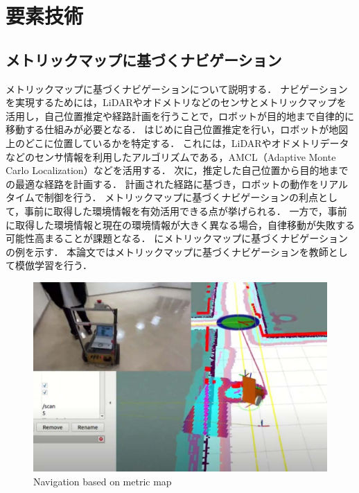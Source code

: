 \chapter{要素技術}
\section{メトリックマップに基づくナビゲーション}
メトリックマップに基づくナビゲーションについて説明する．
ナビゲーションを実現するためには，LiDARやオドメトリなどのセンサとメトリックマップを活用し，自己位置推定や経路計画を行うことで，ロボットが目的地まで自律的に移動する仕組みが必要となる．
はじめに自己位置推定を行い，ロボットが地図上のどこに位置しているかを特定する．
これには，LiDARやオドメトリデータなどのセンサ情報を利用したアルゴリズムである，AMCL（Adaptive Monte Carlo Localization）などを活用する．
次に，推定した自己位置から目的地までの最適な経路を計画する．
計画された経路に基づき，ロボットの動作をリアルタイムで制御を行う．
メトリックマップに基づくナビゲーションの利点として，事前に取得した環境情報を有効活用できる点が挙げられる．
一方で，事前に取得した環境情報と現在の環境情報が大きく異なる場合，自律移動が失敗する可能性高まることが課題となる．
にメトリックマップに基づくナビゲーションの例を示す．
本論文ではメトリックマップに基づくナビゲーションを教師として模倣学習を行う．

\begin{figure}[htbp]
  \centering
  \includegraphics[width=130mm]{images/pdf/other/nav.pdf}
  \caption{Navigation based on metric map}
  \label{fig:nav}
\end{figure}